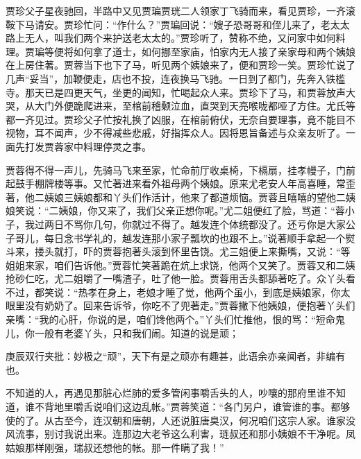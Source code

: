 \begin{parag}
    贾珍父子星夜驰回，半路中又见贾㻞贾珖二人领家丁飞骑而来，看见贾珍，一齐滚鞍下马请安。贾珍忙问：“作什么？”贾㻞回说：“嫂子恐哥哥和侄儿来了，老太太路上无人，叫我们两个来护送老太太的。”贾珍听了，赞称不绝，又问家中如何料理。贾㻞等便将如何拿了道士，如何挪至家庙，怕家内无人接了亲家母和两个姨娘在上房住著。贾蓉当下也下了马，听见两个姨娘来了，便和贾珍一笑。贾珍忙说了几声“妥当”，加鞭便走，店也不投，连夜换马飞驰。一日到了都门，先奔入铁槛寺。那天已是四更天气，坐更的闻知，忙喝起众人来。贾珍下了马，和贾蓉放声大哭，从大门外便跪爬进来，至棺前稽颡泣血，直哭到天亮喉咙都哑了方住。尤氏等都一齐见过。贾珍父子忙按礼换了凶服，在棺前俯伏，无奈自要理事，竟不能目不视物，耳不闻声，少不得减些悲戚，好指挥众人。因将恩旨备述与众亲友听了。一面先打发贾蓉家中料理停灵之事。
\end{parag}


\begin{parag}
    贾蓉得不得一声儿，先骑马飞来至家，忙命前厅收桌椅，下槅扇，挂孝幔子，门前起鼓手棚牌楼等事。又忙著进来看外祖母两个姨娘。原来尤老安人年高喜睡，常歪著，他二姨娘三姨娘都和丫头们作活计，他来了都道烦恼。贾蓉且嘻嘻的望他二姨娘笑说：“二姨娘，你又来了，我们父亲正想你呢。”尤二姐便红了脸，骂道：“蓉小子，我过两日不骂你几句，你就过不得了。越发连个体统都没了。还亏你是大家公子哥儿，每日念书学礼的，越发连那小家子瓢坎的也跟不上。”说著顺手拿起一个熨斗来，搂头就打，吓的贾蓉抱著头滚到怀里告饶。尤三姐便上来撕嘴，又说：“等姐姐来家，咱们告诉他。”贾蓉忙笑著跪在炕上求饶，他两个又笑了。贾蓉又和二姨抢砂仁吃，尤二姐嚼了一嘴渣子，吐了他一脸。贾蓉用舌头都舔著吃了。众丫头看不过，都笑说：“热孝在身上，老娘才睡了觉，他两个虽小，到底是姨娘家，你太眼里没有奶奶了。回来告诉爷，你吃不了兜著走。”贾蓉撇下他姨娘，便抱著丫头们亲嘴：“我的心肝，你说的是，咱们馋他两个。”丫头们忙推他，恨的骂：“短命鬼儿，你一般有老婆丫头，只和我们闹。知道的说是顽；\begin{note}庚辰双行夹批：妙极之“顽”，天下有是之顽亦有趣甚，此语余亦亲闻者，非编有也。\end{note}不知道的人，再遇见那脏心烂肺的爱多管闲事嚼舌头的人，吵嚷的那府里谁不知道，谁不背地里嚼舌说咱们这边乱帐。”贾蓉笑道：“各门另户，谁管谁的事。都够使的了。从古至今，连汉朝和唐朝，人还说脏唐臭汉，何况咱们这宗人家。谁家没风流事，别讨我说出来。连那边大老爷这么利害，琏叔还和那小姨娘不干净呢。凤姑娘那样刚强，瑞叔还想他的帐。那一件瞒了我！”
\end{parag}


